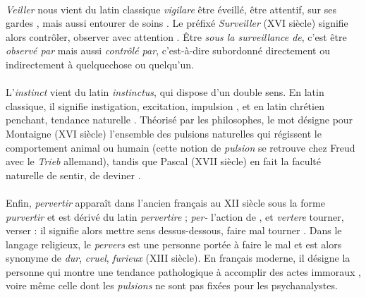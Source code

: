 \paragraph{} \emph{Veiller} nous vient du latin classique \emph{vigilare} \guillemotleft être éveillé, être attentif, sur
ses gardes \guillemotright, mais aussi \guillemotleft entourer de soins \guillemotright \cite{Surveillance0}. Le préfixé
\emph{Surveiller} (XVI siècle) signifie alors \guillemotleft contrôler, observer avec attention \guillemotright.
Être \emph{sous la surveillance de}, c'est être \emph{observé par} mais aussi \emph{contrôlé par}, c'est-à-dire subordonné
directement ou indirectement à quelquechose ou quelqu'un.

\paragraph{} L'\emph{instinct} vient du latin \emph{instinctus}, qui dispose d'un double sens. En latin classique, il 
signifie \guillemotleft instigation, excitation, impulsion \guillemotright, et en latin chrétien \guillemotleft penchant,
tendance naturelle \guillemotright \cite{Instinct0}. Théorisé par les philosophes, le mot désigne pour Montaigne (XVI siècle) 
\guillemotleft l'ensemble des pulsions naturelles qui régissent le comportement animal ou humain \guillemotright (cette 
notion de \emph{pulsion} se retrouve chez Freud avec le \emph{Trieb} allemand), tandis que Pascal (XVII siècle)
en fait \guillemotleft la faculté naturelle de sentir, de deviner \guillemotright.

\paragraph{} Enfin, \emph{pervertir} apparaît dans l'ancien français au XII siècle sous la forme \emph{purvertir} et est
dérivé du latin \emph{pervertire} ; \emph{per-} \guillemotleft l'action de \guillemotright, et \emph{vertere} \guillemotleft
tourner, verser \guillemotright : il signifie alors \guillemotleft mettre sens dessus-dessous, faire mal tourner \guillemotright
\cite{Pervers0}. Dans le langage religieux, le \emph{pervers} est une personne \guillemotleft portée à faire le mal \guillemotright
et est alors synonyme de \emph{dur}, \emph{cruel}, \emph{furieux} (XIII siècle). En français moderne, il désigne 
\guillemotleft la personne qui montre une tendance pathologique à accomplir des actes immoraux \guillemotright, voire même
celle \guillemotleft dont les \emph{pulsions} ne sont pas fixées \guillemotright pour les psychanalystes.

